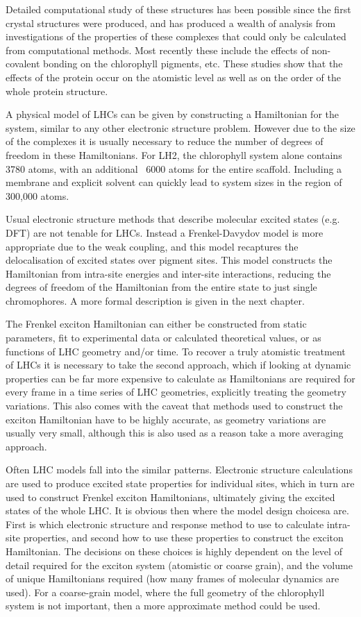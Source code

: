 Detailed computational study of these structures has been possible since the first
crystal structures were produced, and has produced a wealth of analysis from investigations
of the properties of these complexes that could only be calculated from computational
methods. Most recently these include the effects of non-covalent bonding on the 
chlorophyll pigments, etc. These studies show that the effects of the protein occur
on the atomistic level as well as on the order of the whole protein structure.

A physical model of LHCs can be given by constructing a Hamiltonian for the system,
similar to any other electronic structure problem. However due to the size of the
complexes it is usually necessary to reduce the number of degrees of freedom in
these Hamiltonians. For LH2, the chlorophyll system alone contains 3780 atoms, with
an additional ~6000 atoms for the entire scaffold. Including a membrane and explicit
solvent can quickly lead to system sizes in the region of 300,000 atoms.

Usual electronic structure methods that describe molecular excited states (e.g. 
DFT) are not tenable for LHCs. Instead a Frenkel-Davydov model is more appropriate
due to the weak coupling, and this model recaptures the delocalisation of excited
states over pigment sites. This model constructs the Hamiltonian from intra-site 
energies and inter-site interactions, reducing the degrees of freedom of the Hamiltonian
from the entire state to just single chromophores. A more formal description is 
given in the next chapter.

The Frenkel exciton Hamiltonian can either be constructed from static parameters,
fit to experimental data or calculated theoretical values, or as functions of LHC 
geometry and/or time. To recover a truly atomistic treatment of LHCs it is necessary 
to take the second approach, which if looking at dynamic properties can be far more
expensive to calculate as Hamiltonians are required for every frame in a time series 
of LHC geometries, explicitly treating the geometry variations. This also comes 
with the caveat that methods used to construct the exciton Hamiltonian have to be
highly accurate, as geometry variations are usually very small, although this is
also used as a reason take a more averaging approach.

Often LHC models fall into the similar patterns. Electronic structure calculations
are used to produce excited state properties for individual sites, which in turn 
are used to construct Frenkel exciton Hamiltonians, ultimately giving the excited 
states of the whole LHC. It is obvious then where the model design choicesa are. 
First is which electronic structure and response method to use to calculate intra-
site properties, and second how to use these properties to construct the exciton 
Hamiltonian. The decisions on these choices is highly dependent on the level of 
detail required for the exciton system (atomistic or coarse grain), and the volume
of unique Hamiltonians required (how many frames of molecular dynamics are used).
For a coarse-grain model, where the full geometry of the chlorophyll system is not
important, then a more approximate method could be used.

